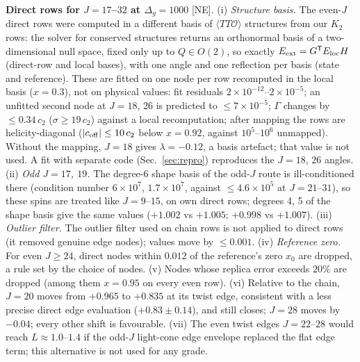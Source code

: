 \documentclass[aps,prl,onecolumn,superscriptaddress,nofootinbib]{revtex4-2}
\begin{document}
\textbf{Direct rows for $J=17$--$32$ at $\Delta_g=1000$} [NE]. (i) \emph{Structure basis.} The even-$J$ direct rows were
computed in a different basis of $\langle TT\mathcal O\rangle$ structures from our $K_2$ rows: the solver for conserved structures
returns an orthonormal basis of a two-dimensional null space, fixed only up to $Q\in O(2)$, so exactly $E_{\rm ext}=G^{\sf T}E_{\rm loc}H$
(direct-row and local bases), with one angle and one reflection per basis (state and reference). These are fitted on one node per
row recomputed in the local basis ($x=0.3$), not on physical values: fit residuals $2\times10^{-12}$--$2\times10^{-5}$; an unfitted
second node at $J=18$, $26$ is predicted to $\le7\times10^{-5}$; $\Gamma$ changes by $\le0.34\,c_2$ ($\sigma\ge19\,c_2$) against a
local recomputation; after mapping the rows are helicity-diagonal ($|c_{\rm off}|\le10\,c_2$ below $x=0.92$, against
$10^5$--$10^6$ unmapped). Without the mapping, $J=18$ gives $\lambda=-0.12$, a basis artefact; that value is not used. A fit with
separate code (Sec.~\ref{sec:repro}) reproduces the $J=18$, $26$ angles. (ii) \emph{Odd $J=17$, $19$.} The degree-6 shape basis of the odd-$J$ route is
ill-conditioned there (condition number $6\times10^7$, $1.7\times10^7$, against $\le4.6\times10^5$ at $J=21$--$31$), so these spins
are treated like $J=9$--$15$, on own direct rows; degrees 4, 5 of the shape basis give the same values ($+1.002$ vs $+1.005$; $+0.998$ vs $+1.007$). (iii) \emph{Outlier filter.} The
outlier filter used on chain rows is not applied to direct rows (it removed genuine edge nodes); values move by $\le0.001$.
(iv) \emph{Reference zero.} For even $J\ge24$, direct nodes within $0.012$ of the reference's zero $x_0$ are dropped, a rule set by
the choice of nodes. (v) Nodes whose replica error exceeds $20\%$ are dropped (among them $x=0.95$ on every even row). (vi) Relative
to the chain, $J=20$ moves from $+0.965$ to $+0.835$ at its twist edge, consistent with a less precise direct edge evaluation
($+0.83\pm0.14$), and still closes; $J=28$ moves by $-0.04$; every other shift is favourable. (vii) The even twist edges
$J=22$--$28$ would reach $L\approx1.0$--$1.4$ if the odd-$J$ light-cone edge envelope replaced the flat edge term; this
alternative is not used for any grade.
\end{document}
